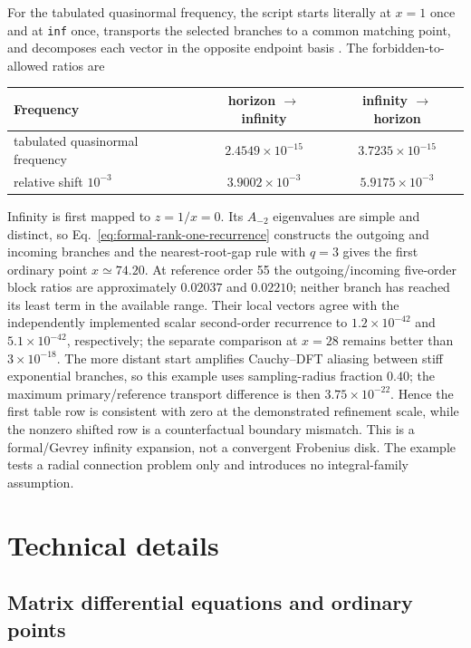 \documentclass[11pt]{article}
\begin{document}
For the tabulated quasinormal frequency, the script starts literally at $x=1$ once and at
\texttt{inf} once, transports the selected branches to a common matching point, and
decomposes each vector in the opposite endpoint basis
\cite{Leaver:1985ax,Berti:2009kk}.  The forbidden-to-allowed ratios are
\begin{center}
\begin{tabular}{lcc}
\toprule
Frequency & horizon $\to$ infinity & infinity $\to$ horizon\\
\midrule
tabulated quasinormal frequency & $2.4549\times10^{-15}$ & $3.7235\times10^{-15}$\\
relative shift $10^{-3}$ & $3.9002\times10^{-3}$ & $5.9175\times10^{-3}$\\
\bottomrule
\end{tabular}
\end{center}
Infinity is first mapped to $z=1/x=0$.  Its $A_{-2}$ eigenvalues are simple and distinct, so
Eq.~\eqref{eq:formal-rank-one-recurrence} constructs the outgoing and incoming branches and
the nearest-root-gap rule with $q=3$ gives the first ordinary point $x\simeq74.20$.  At
reference order 55 the outgoing/incoming five-order block ratios are approximately
$0.02037$ and $0.02210$; neither branch has reached its least term in the available range.
Their local vectors agree with the independently implemented scalar second-order recurrence
to $1.2\times10^{-42}$ and $5.1\times10^{-42}$, respectively; the separate comparison at
$x=28$ remains better than $3\times10^{-18}$.  The more distant start amplifies Cauchy--DFT
aliasing between stiff exponential branches, so this example uses sampling-radius fraction
$0.40$; the maximum primary/reference transport difference is then $3.75\times10^{-22}$.
Hence the first table row is consistent with zero at the demonstrated
refinement scale, while the nonzero shifted row is a counterfactual boundary mismatch.  This
is a formal/Gevrey infinity expansion, not a convergent Frobenius disk.  The example tests a
radial connection problem only and introduces no integral-family assumption.

\section{Technical details}
\label{sec:technical-details}

\subsection{Matrix differential equations and ordinary points}
\label{subsec:ordinary}
\end{document}
